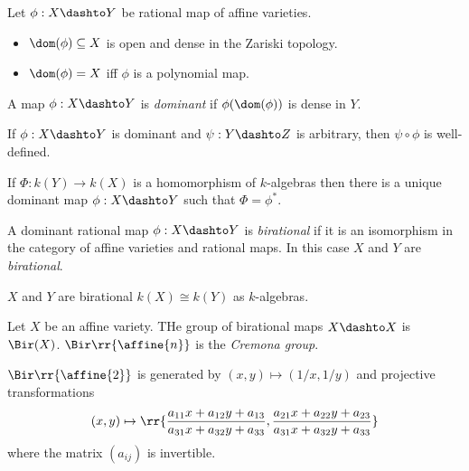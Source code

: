 \documentclass{article}
\begin{document}
\begin{theorem}
  Let $\phi:X\dashto Y$ be rational map of affine varieties.
  \begin{itemize}
    \item $\dom(\phi)\subseteq X$ is open and dense in the Zariski topology.
    \item $\dom(\phi)=X$ iff $\phi$ is a polynomial map.
  \end{itemize}
\end{theorem}

\begin{definition}
  A map $\phi : X\dashto Y$ is \emph{dominant} if $\phi(\dom(\phi))$ is dense in $Y$.
\end{definition}

\begin{proposition}
  If $\phi:X\dashto Y$ is dominant and $\psi:Y\dashto Z$ is arbitrary, then $\psi\circ\phi$
  is well-defined.
\end{proposition}

\begin{lemma}
  If $\Phi:k(Y)\to k(X)$ is a homomorphism of $k$-algebras then there is a unique dominant
  map $\phi:X\dashto Y$ such that $\Phi = \phi^*$.
\end{lemma}

\begin{definition}
  A dominant rational map $\phi:X\dashto Y$ is \emph{birational} if it is an isomorphism
  in the category of affine varieties and rational maps. In this case $X$ and $Y$
  are \emph{birational}.
\end{definition}

\begin{corollary}
  $X$ and $Y$ are birational \iff $k(X)\cong k(Y)$ as $k$-algebras.
\end{corollary}

\begin{definition}
  Let $X$ be an affine variety. THe group of birational maps $X\dashto X$ is $\Bir(X)$.
  $\Bir\rr{\affine{n}}$ is the \emph{Cremona group}.
\end{definition}

\begin{theorem}[Noether]
  $\Bir\rr{\affine{2}}$ is generated by $(x,y)\mapsto (1/x,1/y)$ and projective transformations
  \begin{align*}
    (x,y)\mapsto \rr{\frac{a_{11}x + a_{12}y + a_{13}}{a_{31}x + a_{32}y + a_{33}},
    \frac{a_{21}x + a_{22}y + a_{23}}{a_{31}x + a_{32}y + a_{33}}}
  \end{align*}
  where the matrix $(a_{ij})$ is invertible.
\end{theorem}
\end{document}
